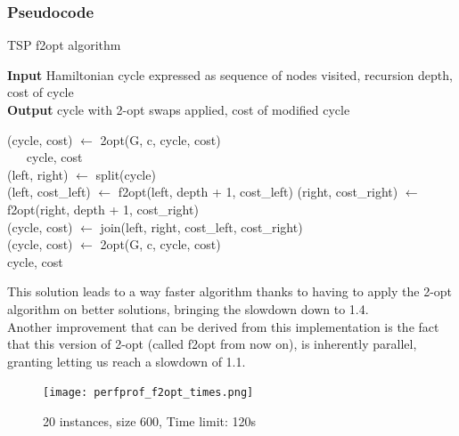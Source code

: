 \subsubsection{Pseudocode}
\begin{algorithm}
    \caption{TSP f2opt algorithm}
    \hspace*{\algorithmicindent} \textbf{Input} Hamiltonian cycle expressed as sequence of nodes visited, recursion depth, cost of cycle\\
    \hspace*{\algorithmicindent} \textbf{Output} cycle with 2-opt swaps applied, cost of modified cycle\\
    \begin{algorithmic}

            \State (cycle, cost) $\gets$ 2opt(G, c, cycle, cost)\\
            $\quad\;\;$\Return cycle, cost
        \EndIf\\

            \State (left, right) $\gets$ split(cycle)\\
            \State (left, cost\_left) $\gets$ f2opt(left, depth + 1, cost\_left)
            \State (right, cost\_right) $\gets$ f2opt(right, depth + 1, cost\_right)\\
            \State (cycle, cost) $\gets$ join(left, right, cost\_left, cost\_right)\\
            \State (cycle, cost) $\gets$ 2opt(G, c, cycle, cost)
        \EndWhile\\

        \Return cycle, cost

    \end{algorithmic}
\end{algorithm}

This solution leads to a way faster algorithm thanks to having to apply the 2-opt algorithm on better solutions, bringing the slowdown down to 1.4.\\
Another improvement that can be derived from this implementation is the fact that this version of 2-opt (called f2opt from now on), is inherently parallel, granting letting us reach a slowdown of 1.1.

\begin{figure}[h]
    \centering
    \texttt{[image: perfprof\_f2opt\_times.png]}
    \caption*{20 instances, size 600, Time limit: 120s}
\end{figure}

